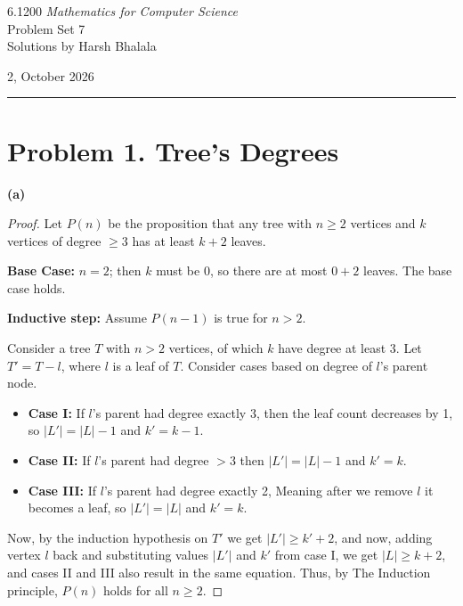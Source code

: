 \documentclass{article}
\begin{document}
\noindent
\begin{minipage}[t]{0.68\textwidth}
{\large 6.1200 \textit{Mathematics for Computer Science}}\\[4pt]
{\large Problem Set 7}\\[4pt]
{\large Solutions by Harsh Bhalala}
\end{minipage}%
\hfill
\begin{minipage}[t]{0.27\textwidth}
\raggedleft
{\large 2, October 2026}
\end{minipage}

\vspace{6pt}

\noindent\rule{\textwidth}{0.5pt}

\section*{Problem 1. Tree's Degrees}
\textbf{(a)}
\begin{proof}
Let $P(n)$ be the proposition that any tree with $n \ge 2$ vertices and $k$ vertices of degree $\ge 3$ has at least $k + 2$ leaves.

\textbf{Base Case:} $n = 2$; then $k$ must be 0, so there are at most $0 + 2$ leaves. The base case holds.

\textbf{Inductive step:} Assume $P(n-1)$ is true for $n > 2$.

Consider a tree $T$ with $n > 2$ vertices, of which $k$ have degree at least 3. Let $T' = T - l$, where $l$ is a leaf of $T$. Consider cases based on degree of $l$'s parent node.
\begin{itemize}
\item \textbf{Case I:} If $l$'s parent had degree exactly 3, then the leaf count decreases by 1, so $|L'| = |L| - 1$ and $k' = k - 1$.
\item \textbf{Case II:} If $l$'s parent had degree $> 3$ then $|L'| = |L| - 1$ and $k' = k$.
\item \textbf{Case III:} If $l$'s parent had degree exactly 2, Meaning after we remove $l$ it becomes a leaf, so $|L'| = |L|$ and $k' = k$.

\end{itemize}
Now, by the induction hypothesis on $T'$ we get $|L'| \geq k' + 2$, and now, adding vertex $l$ back and substituting
values $|L'|$ and $k'$ from case I, we get $|L| \geq k + 2$, and cases II and III also result in the same equation.
Thus, by The Induction principle, $P(n)$ holds for all $n \geq 2$.

\end{proof}
\end{document}
